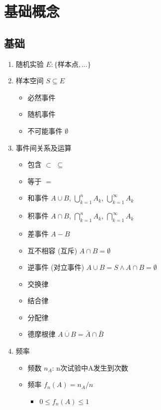 \documentclass[main.tex]{subfiles}
\begin{document}
\chapter{基础概念}
\section{基础}
\begin{enumerate}
    \item 随机实验 $E: \{\text{样本点}, \ldots\}$
    \item 样本空间 $S \subseteq E$
        \begin{itemize}
            \item 必然事件
            \item 随机事件
            \item 不可能事件 $\emptyset$
        \end{itemize}
    \item 事件间关系及运算
        \begin{itemize}
            \item 包含 $\subset$ $\subseteq$
            \item 等于 $=$
            \item 和事件 $A\cup B$,
                         $\bigcup_{k=1}^n A_k$,
                         $\bigcup_{k=1}^\infty A_k$
            \item 积事件 $A\cap B$,
                         $\bigcap_{k=1}^n A_k$,
                         $\bigcap_{k=1}^\infty A_k$
            \item 差事件 $A - B$
            \item 互不相容 (互斥) $A \cap B = \emptyset$
            \item 逆事件 (对立事件) $A \cup B = S \land A \cap B = \emptyset$
            \item 交换律
            \item 结合律
            \item 分配律
            \item 德摩根律 $\overline{A \cup B} = \bar{A} \cap \bar{B}$
        \end{itemize}
    \item 频率
        \begin{itemize}
            \item 频数 $n_A$: n次试验中A发生到次数
            \item 频率 $f_n(A) = n_A / n$
                \begin{itemize}
                    \item $0 \leq f_n(A) \leq 1$

\end{itemize}
\end{itemize}
\end{enumerate}
\end{document}

